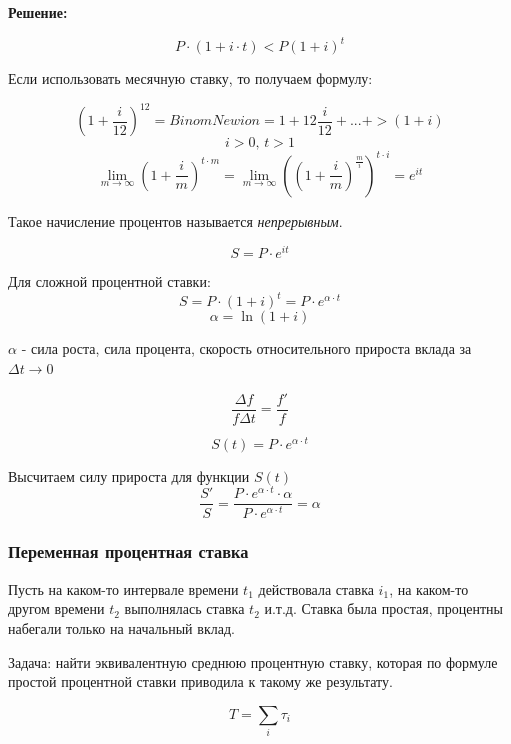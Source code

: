 \documentclass[aps,%
12pt,%
final,%
oneside,
onecolumn,%
musixtex, %
superscriptaddress,%
centertags]{article} %
\begin{document}
\textbf{Решение:}

$$ P \cdot (1+i \cdot t) < P (1+i)^t $$

Если использовать месячную ставку, то получаем формулу:

$$(1+\frac{i}{12})^{12} = {Binom Newion} = 1 + 12 \frac{i}{12} + ... + > (1+i) $$
$$ i>0 \text{, } t > 1 $$
$$ \lim_{m\to \infty} (1+\frac{i}{m})^{t\cdot m} = \lim_{m\to \infty} ((1+\frac{i}{m})^{\frac{m}{i}})^{t\cdot i} = e^{it} $$

Такое начисление процентов называется \textit{непрерывным}.

$$ S = P \cdot e^{it} $$

Для сложной процентной ставки:
$$ S = P \cdot (1+i)^t = P \cdot e^{\alpha \cdot t} $$
$$ \alpha = \ln (1+i) $$

$\alpha$ - сила роста, сила процента, скорость относительного прироста вклада за $\Delta t \rightarrow 0$

$$ \frac{\Delta f}{f \Delta t} = \frac{f'}{f} $$

$$S(t) = P \cdot e^{\alpha \cdot t}$$

Высчитаем силу прироста для функции $S(t)$
$$ \frac{S'}{S} = \frac{P \cdot e^{\alpha \cdot t} \cdot \alpha}{P \cdot e^{\alpha \cdot t}} = \alpha $$

\subsubsection{Переменная процентная ставка}

Пусть на каком-то интервале времени $t_1$ действовала ставка $i_1$, на каком-то другом времени $t_2$ выполнялась ставка $t_2$ и.т.д. Ставка была простая, процентны набегали только на начальный вклад.

Задача: найти эквивалентную среднюю процентную ставку, которая по формуле простой процентной ставки приводила к такому же результату. 

\begin{center}
\end{center}
$$ T =  \sum_{i}{\tau_i} $$
\end{document}
